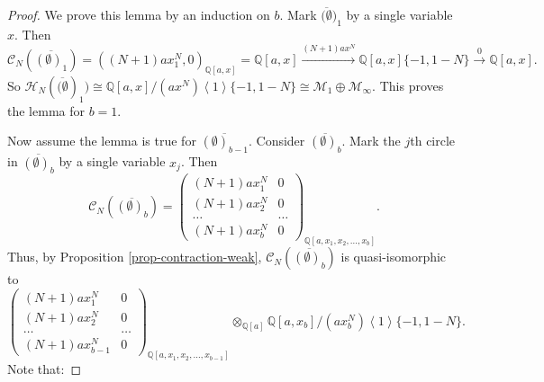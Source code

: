 \documentclass{amsart}
\theoremstyle{plain}
\theoremstyle{definition}
\theoremstyle{remark}
\numberwithin{equation}{section}
\begin{document}
\begin{proof}
We prove this lemma by an induction on $b$. Mark $\overline{(\emptyset})_1$ by a single variable $x$. Then 
\[
{\mathcal{C}}_N(\overline{(\emptyset)_1}) = ((N+1)ax_1^{N},0)_{{\mathbb{Q}}[a,x]} = {\mathbb{Q}}[a,x] \xrightarrow{(N+1)ax^{N}} {\mathbb{Q}}[a,x] \{-1,1-N\} \xrightarrow{0} {\mathbb{Q}}[a,x].
\]
So ${\mathcal{H}}_N(\overline{(\emptyset})_1) \cong {\mathbb{Q}}[a,x]/(ax^N) \left\langle 1\right\rangle \{-1, 1-N\} \cong \mathcal{M}_1 \oplus \mathcal{M}_\infty$. This proves the lemma for $b=1$. 

Now assume the lemma is true for $\overline{(\emptyset)_{b-1}}$. Consider $\overline{(\emptyset)_b}$. Mark the $j$th circle in $\overline{(\emptyset)_b}$ by a single variable $x_j$. Then 
\[
{\mathcal{C}}_N(\overline{(\emptyset)_b}) = \left(\begin{array}{cc}
  (N+1)ax_1^N & 0 \\
  (N+1)ax_2^N & 0 \\
  \dots & \dots \\
  (N+1)ax_b^N & 0
\end{array}\right)_{{\mathbb{Q}}[a,x_1,x_2,\dots,x_b]}.
\]
Thus, by Proposition \ref{prop-contraction-weak}, ${\mathcal{C}}_N(\overline{(\emptyset)_b})$ is quasi-isomorphic to 
\[
\left(\begin{array}{cc}
  (N+1)ax_1^N & 0 \\
  (N+1)ax_2^N & 0 \\
  \dots & \dots \\
  (N+1)ax_{b-1}^N & 0
\end{array}\right)_{{\mathbb{Q}}[a,x_1,x_2,\dots,x_{b-1}]} \otimes_{{\mathbb{Q}}[a]} {\mathbb{Q}}[a,x_b]/(ax_b^N)\left\langle 1\right\rangle \{-1, 1-N\}.
\] 
Note that:
\end{proof}
\end{document}
